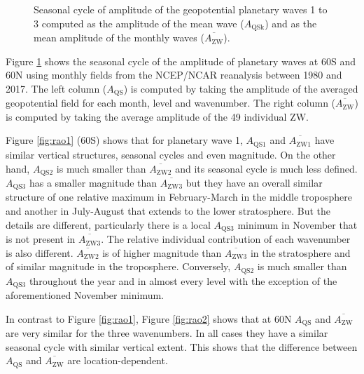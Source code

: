\documentclass[draft,linenumbers]{agujournal2018}
\begin{document}
\begin{figure}[h]

{\centering {}\newline{}

}

\caption{Seasonal cycle of amplitude of the geopotential planetary waves 1 to 3 computed as the amplitude of the mean wave ($A_\mathrm{QSk}$) and as the mean amplitude of the monthly waves ($\overline{A_\mathrm{ZW} }$).}\label{fig:rao}
\end{figure}

Figure \ref{fig:rao} shows the seasonal cycle of the amplitude of
planetary waves at 60\degree S and 60\degree N using monthly fields from
the NCEP/NCAR reanalysis \citep{Kalnay1996} between 1980 and 2017. The
left column (\(A_\mathrm{QS}\)) is computed by taking the amplitude of
the averaged geopotential field for each month, level and wavenumber.
The right column (\(\overline{A_\mathrm{ZW}}\)) is computed by taking
the average amplitude of the 49 individual ZW.

Figure \ref{fig:rao1} (60\degree S) shows that for planetary wave 1,
\(A_\mathrm{QS1}\) and \(\overline{A_\mathrm{ZW1}}\) have similar
vertical structures, seasonal cycles and even magnitude. On the other
hand, \(A_\mathrm{QS2}\) is much smaller than
\(\overline{A_\mathrm{ZW2}}\) and its seasonal cycle is much less
defined. \(A_\mathrm{QS3}\) has a smaller magnitude than
\(\overline{A_\mathrm{ZW3}}\) but they have an overall similar structure
of one relative maximum in February-March in the middle troposphere and
another in July-August that extends to the lower stratosphere. But the
details are different, particularly there is a local \(A_\mathrm{QS3}\)
minimum in November that is not present in
\(\overline{A_\mathrm{ZW3}}\). The relative individual contribution of
each wavenumber is also different. \(\overline{A_\mathrm{ZW2}}\) is of
higher magnitude than \(\overline{A_\mathrm{ZW3}}\) in the stratosphere
and of similar magnitude in the troposphere. Conversely,
\(A_\mathrm{QS2}\) is much smaller than \(A_\mathrm{QS3}\) throughout
the year and in almost every level with the exception of the
aforementioned November minimum.

In contrast to Figure \ref{fig:rao1}, Figure \ref{fig:rao2} shows that
at 60\degree N \(A_\mathrm{QS}\) and \(\overline{A_\mathrm{ZW}}\) are
very similar for the three wavenumbers. In all cases they have a similar
seasonal cycle with similar vertical extent. This shows that the
difference between \(A_\mathrm{QS}\) and \(\overline{A_\mathrm{ZW}}\)
are location-dependent.
\end{document}
